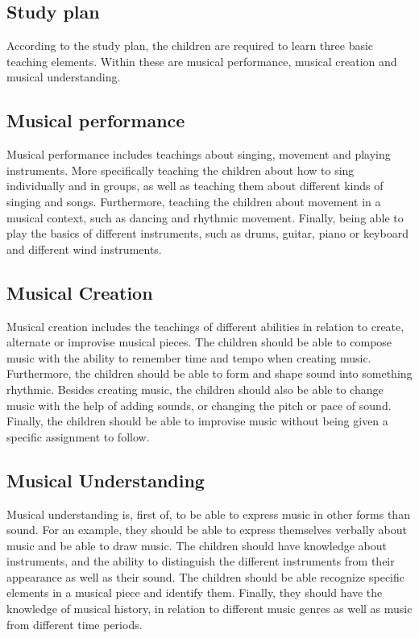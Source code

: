 	\subsection{Study plan}
	
	According to the study plan, the children are required to learn three basic teaching elements. Within these are musical performance, musical creation and musical understanding.
	
	\subsection*{Musical performance}
	Musical performance includes teachings about singing, movement and playing instruments. More specifically teaching the children about how to sing individually and in groups, as well as teaching them about different kinds of singing and songs. Furthermore, teaching the children about movement in a musical context, such as dancing and rhythmic movement. Finally, being able to play the basics of different instruments, such as drums, guitar, piano or keyboard and different wind instruments.
	
	\subsection*{Musical Creation}
	Musical creation includes the teachings of different abilities in relation to create, alternate or improvise musical pieces. The children should be able to compose music with the ability to remember time and tempo when creating music. Furthermore, the children should be able to form and shape sound into something rhythmic. Besides creating music, the children should also be able to change music with the help of adding sounds, or changing the pitch or pace of sound. Finally, the children should be able to improvise music without being given a specific assignment to follow.
	
	\subsection*{Musical Understanding}
	Musical understanding is, first of, to be able to express music in other forms than sound. For an example, they should be able to express themselves verbally about music and be able to draw music. The children should have knowledge about instruments, and the ability to distinguish the different instruments from their appearance as well as their sound. The children should be able recognize specific elements in a musical piece and identify them. Finally, they should have the knowledge of musical history, in relation to different music genres as well as music from different time periods.
	\\
	
